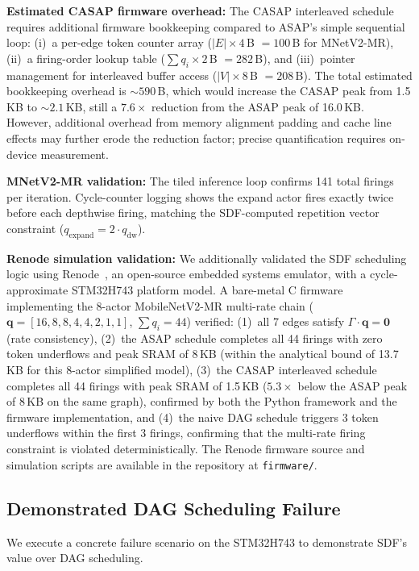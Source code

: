 \documentclass[journal]{IEEEtran}
\begin{document}
\textbf{Estimated CASAP firmware overhead:}
The CASAP interleaved schedule requires additional firmware bookkeeping compared to ASAP's simple sequential loop: (i)~a per-edge token counter array ($|E| \times 4$\,B $= 100$\,B for MNetV2-MR), (ii)~a firing-order lookup table ($\sum q_i \times 2$\,B $= 282$\,B), and (iii)~pointer management for interleaved buffer access ($|V| \times 8$\,B $= 208$\,B). The total estimated bookkeeping overhead is ${\sim}590$\,B, which would increase the CASAP peak from 1.5\,KB to ${\sim}2.1$\,KB, still a $7.6\times$ reduction from the ASAP peak of 16.0\,KB. However, additional overhead from memory alignment padding and cache line effects may further erode the reduction factor; precise quantification requires on-device measurement.

\textbf{MNetV2-MR validation:}
The tiled inference loop confirms 141 total firings per iteration.
Cycle-counter logging shows the expand actor fires exactly twice before each depthwise firing, matching the SDF-computed repetition vector constraint ($q_{\mathrm{expand}} = 2 \cdot q_{\mathrm{dw}}$).

\textbf{Renode simulation validation:}
We additionally validated the SDF scheduling logic using Renode~\cite{renode2024}, an open-source embedded systems emulator, with a cycle-approximate STM32H743 platform model.
A bare-metal C firmware implementing the 8-actor MobileNetV2-MR multi-rate chain ($\mathbf{q} = [16, 8, 8, 4, 4, 2, 1, 1]$, $\sum q_i = 44$) verified:
(1)~all 7 edges satisfy $\Gamma \cdot \mathbf{q} = \mathbf{0}$ (rate consistency),
(2)~the ASAP schedule completes all 44 firings with zero token underflows and peak SRAM of 8\,KB (within the analytical bound of 13.7\,KB for this 8-actor simplified model),
(3)~the CASAP interleaved schedule completes all 44 firings with peak SRAM of 1.5\,KB ($5.3\times$ below the ASAP peak of 8\,KB on the same graph), confirmed by both the Python framework and the firmware implementation,
and (4)~the naive DAG schedule triggers 3 token underflows within the first 3 firings, confirming that the multi-rate firing constraint is violated deterministically.
The Renode firmware source and simulation scripts are available in the repository at \texttt{firmware/}.

\subsection{Demonstrated DAG Scheduling Failure}
\label{sec:dag_failure}

We execute a concrete failure scenario on the STM32H743 to demonstrate SDF's value over DAG scheduling.
\end{document}
